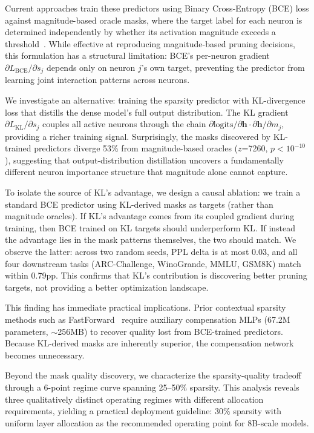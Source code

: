 \documentclass[11pt,a4paper]{article}
\begin{document}
Current approaches train these predictors using Binary Cross-Entropy (BCE) loss against magnitude-based oracle masks, where the target label for each neuron is determined independently by whether its activation magnitude exceeds a threshold~\cite{sun2024fastforward}.
While effective at reproducing magnitude-based pruning decisions, this formulation has a structural limitation: BCE's per-neuron gradient $\partial L_{\text{BCE}}/\partial s_j$ depends only on neuron $j$'s own target, preventing the predictor from learning joint interaction patterns across neurons.

We investigate an alternative: training the sparsity predictor with KL-divergence loss that distills the dense model's full output distribution.
The KL gradient $\partial L_{\text{KL}}/\partial s_j$ couples all active neurons through the chain $\partial \text{logits}/\partial \mathbf{h} \cdot \partial \mathbf{h}/\partial m_j$, providing a richer training signal.
Surprisingly, the masks discovered by KL-trained predictors diverge 53\% from magnitude-based oracles ($z$=7260, $p<10^{-10}$), suggesting that output-distribution distillation uncovers a fundamentally different neuron importance structure that magnitude alone cannot capture.

To isolate the source of KL's advantage, we design a causal ablation: we train a standard BCE predictor using KL-derived masks as targets (rather than magnitude oracles).
If KL's advantage comes from its coupled gradient during training, then BCE trained on KL targets should underperform KL.
If instead the advantage lies in the mask patterns themselves, the two should match.
We observe the latter: across two random seeds, PPL delta is at most 0.03, and all four downstream tasks (ARC-Challenge, WinoGrande, MMLU, GSM8K) match within 0.79pp.
This confirms that KL's contribution is discovering better pruning targets, not providing a better optimization landscape.

This finding has immediate practical implications.
Prior contextual sparsity methods such as FastForward~\cite{sun2024fastforward} require auxiliary compensation MLPs (67.2M parameters, $\sim$256MB) to recover quality lost from BCE-trained predictors.
Because KL-derived masks are inherently superior, the compensation network becomes unnecessary.

Beyond the mask quality discovery, we characterize the sparsity-quality tradeoff through a 6-point regime curve spanning 25--50\% sparsity.
This analysis reveals three qualitatively distinct operating regimes with different allocation requirements, yielding a practical deployment guideline: 30\% sparsity with uniform layer allocation as the recommended operating point for 8B-scale models.
\end{document}
